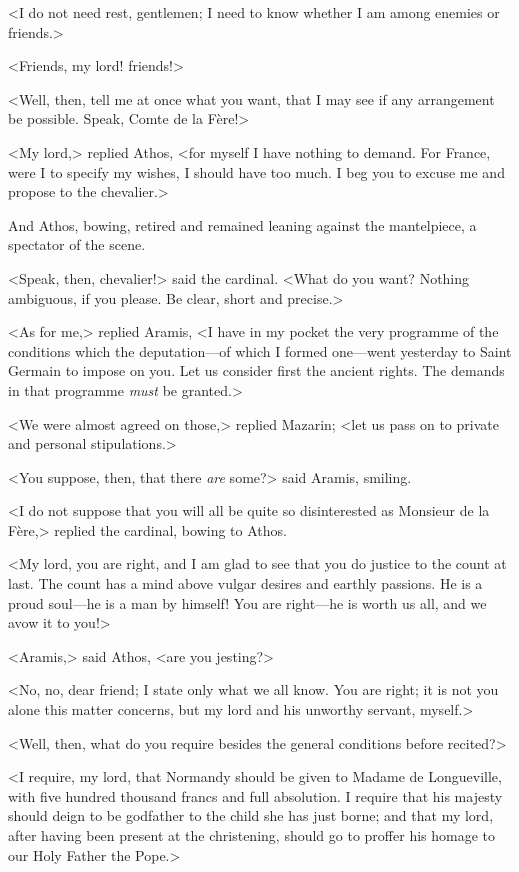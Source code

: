<I do not need rest, gentlemen; I need to know whether I am among enemies or friends.>

<Friends, my lord! friends!>

<Well, then, tell me at once what you want, that I may see if any arrangement be possible. Speak, Comte de la Fère!>

<My lord,> replied Athos, <for myself I have nothing to demand. For France, were I to specify my wishes, I should have too much. I beg you to excuse me and propose to the chevalier.>

And Athos, bowing, retired and remained leaning against the mantelpiece, a spectator of the scene.

<Speak, then, chevalier!> said the cardinal. <What do you want? Nothing ambiguous, if you please. Be clear, short and precise.>

<As for me,> replied Aramis, <I have in my pocket the very programme of the conditions which the deputation—of which I formed one—went yesterday to Saint Germain to impose on you. Let us consider first the ancient rights. The demands in that programme \textit{must} be granted.>

<We were almost agreed on those,> replied Mazarin; <let us pass on to private and personal stipulations.>

<You suppose, then, that there \textit{are} some?> said Aramis, smiling.

<I do not suppose that you will all be quite so disinterested as Monsieur de la Fère,> replied the cardinal, bowing to Athos.

<My lord, you are right, and I am glad to see that you do justice to the count at last. The count has a mind above vulgar desires and earthly passions. He is a proud soul—he is a man by himself! You are right—he is worth us all, and we avow it to you!>

<Aramis,> said Athos, <are you jesting?>

<No, no, dear friend; I state only what we all know. You are right; it is not you alone this matter concerns, but my lord and his unworthy servant, myself.>

<Well, then, what do you require besides the general conditions before recited?>

<I require, my lord, that Normandy should be given to Madame de Longueville, with five hundred thousand francs and full absolution. I require that his majesty should deign to be godfather to the child she has just borne; and that my lord, after having been present at the christening, should go to proffer his homage to our Holy Father the Pope.>

